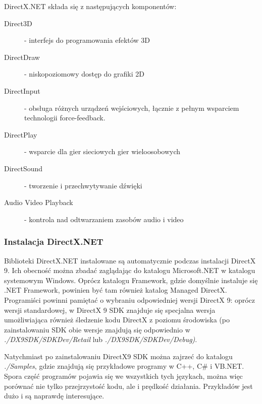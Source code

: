 DirectX.NET składa się z następujących komponentów:
\begin{description}
\item [Direct3D] - interfejs do programowania efektów 3D
\item [DirectDraw] - niskopoziomowy dostęp do grafiki 2D
\item [DirectInput] - obsługa różnych urządzeń wejściowych, łącznie z pełnym wsparciem technologii force-feedback.
\item [DirectPlay] - wsparcie dla gier sieciowych gier wieloosobowych 
\item [DirectSound] - tworzenie i przechwytywanie dźwięki
\item [Audio Video Playback] - kontrola nad odtwarzaniem zasobów audio i video
\end{description}

\subsubsection{Instalacja DirectX.NET}

Biblioteki DirectX.NET instalowane są automatycznie podczas instalacji DirectX 9. 
Ich obecność można zbadać zaglądając do katalogu Microsoft.NET w katalogu systemowym Windows. 
Oprócz katalogu Framework, gdzie domyślnie instaluje się .NET Framework, powinien być tam również 
katalog Managed DirectX. Programiści powinni pamiętać o wybraniu odpowiedniej wersji DirectX 9: 
oprócz wersji standardowej, w DirectX 9 SDK znajduje się specjalna wersja umożliwiająca również 
śledzenie kodu DirectX z poziomu środowiska (po zainstalowaniu SDK obie wersje znajdują się 
odpowiednio w {\em ./DX9SDK/SDKDev/Retail} lub {\em ./DX9SDK/SDKDev/Debug)}.

Natychmiast po zainstalowaniu DirectX9 SDK można zajrzeć do katalogu {\em ./Samples}, 
gdzie znajdują się przykładowe programy w C++, C\# i VB.NET. Spora część programów pojawia się we 
wszystkich tych językach, można więc porównać nie tylko przejrzystość kodu, ale i prędkość działania. 
Przykładów jest dużo i są naprawdę interesujące.

